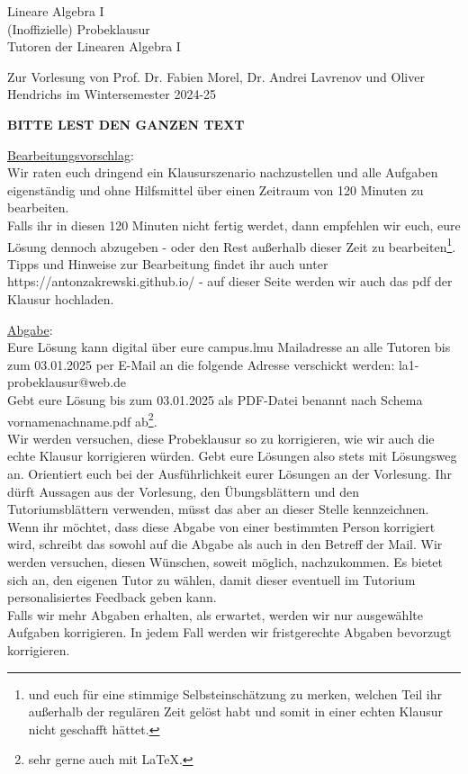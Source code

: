 \documentclass[11pt]{report} %
\begin{document}
	\begin{center}
	{\Large Lineare Algebra I}\\
	{\large (Inoffizielle) Probeklausur}\\
	\medskip
	{\sc Tutoren der Linearen Algebra I}\\ 
	\end{center}

    \noindent    
	Zur Vorlesung von Prof. Dr. Fabien Morel, Dr. Andrei Lavrenov und Oliver Hendrichs im Wintersemester 2024-25 \\
	\begin{center}
        \Large 
        \textbf{BITTE LEST DEN GANZEN TEXT} 
	\end{center}

	
	\medskip\noindent
	\underline{Bearbeitungsvorschlag}:\\
		Wir raten euch dringend ein Klausurszenario nachzustellen und alle Aufgaben eigenständig und ohne Hilfsmittel über einen Zeitraum von 120 Minuten zu bearbeiten.\\
		Falls ihr in diesen 120 Minuten nicht fertig werdet, dann empfehlen wir euch, eure Lösung dennoch abzugeben - oder den Rest außerhalb dieser Zeit zu bearbeiten\footnote{und euch für eine stimmige Selbsteinschätzung zu merken, welchen Teil ihr außerhalb der regulären Zeit gelöst habt und somit in einer echten Klausur nicht geschafft hättet.}.\\
		Tipps und Hinweise zur Bearbeitung findet ihr auch unter https://antonzakrewski.github.io/ - auf dieser Seite werden wir auch das pdf der Klausur hochladen.
	
	\medskip\noindent
	\underline{Abgabe}:\\
		Eure Lösung kann digital über eure campus.lmu Mailadresse an alle Tutoren bis zum 03.01.2025 per E-Mail an die folgende Adresse verschickt werden: la1-probeklausur@web.de\\
        Gebt eure Lösung bis zum 03.01.2025 als PDF-Datei benannt nach Schema vorname\textunderscore nachname.pdf ab\footnote{sehr gerne auch mit \LaTeX.}. \\
		Wir werden versuchen, diese Probeklausur so zu korrigieren, wie wir auch die echte Klausur korrigieren würden. Gebt eure Lösungen also stets mit Lösungsweg an. Orientiert euch bei der Ausführlichkeit eurer Lösungen an der Vorlesung. Ihr dürft Aussagen aus der Vorlesung, den Übungsblättern und den Tutoriumsblättern verwenden, müsst das aber an dieser Stelle kennzeichnen.\\
        Wenn ihr möchtet, dass diese Abgabe von einer bestimmten Person korrigiert wird, schreibt das sowohl auf die Abgabe als auch in den Betreff der Mail. Wir werden versuchen, diesen Wünschen, soweit möglich, nachzukommen. Es bietet sich an, den eigenen Tutor zu wählen, damit dieser eventuell im Tutorium personalisiertes Feedback geben kann. \\
        Falls wir mehr Abgaben erhalten, als erwartet, werden wir nur ausgewählte Aufgaben korrigieren. In jedem Fall werden wir fristgerechte Abgaben bevorzugt korrigieren.\\
\end{document}
